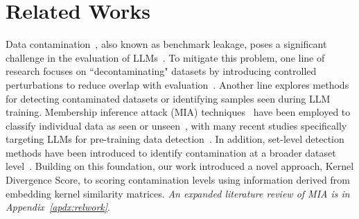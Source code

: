 \section{Related Works}

Data contamination~\cite{magar2022data,xu2024benchmark,balloccu2024leak}, also known as benchmark leakage, poses a significant challenge in the evaluation of LLMs~\cite{zhou2023don,duan2024membership}.
To mitigate this problem, one line of research focuses on ``decontaminating" datasets by introducing controlled perturbations to reduce overlap with evaluation~\cite{yang2023rethinking}.
Another line explores methods for detecting contaminated datasets or identifying samples seen during LLM training. 
Membership inference attack (MIA) techniques~\cite{shokri2017membership,truex2019demystifying} have been employed to classify individual data as seen or unseen~\cite{yeom2018privacy,salem2019ml,mattern2023membership}, with many recent studies specifically targeting LLMs for pre-training data detection~\cite{carlini2021extracting,shidetecting,zhang2024min,xie2024recall,li2023estimating,ye2024data}.
In addition, set-level detection methods have been introduced to identify contamination at a broader dataset level~\cite{orenproving,zhang2024pacost,golchintime}.
Building on this foundation, our work introduced a novel approach, Kernel Divergence Score, to scoring contamination levels using information derived from embedding kernel similarity matrices. 
\emph{An expanded literature review of MIA is in Appendix~\ref{apdx:relwork}}.

